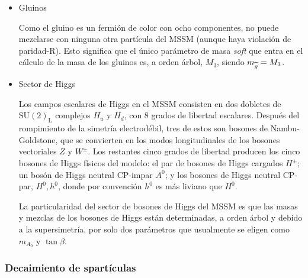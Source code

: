 \begin{itemize}
\item Gluinos

Como el gluino es un fermión de color con ocho componentes, no puede mezclarse con ninguna
otra partícula del MSSM (aunque haya violación de paridad-R). Esto significa que el único
parámetro de masa \emph{soft} que entra en el cálculo de la masa de los gluinos es, a
orden árbol, $M_3$, siendo $m_{\widetilde{g}} = M_3$.


\item Sector de Higgs

  Los campos escalares de Higgs en el MSSM consisten en dos dobletes de
  $\text{SU}(2)_\text{L}$ complejos $H_u$ y $H_d$, con 8 grados de libertad
  escalares. Después del rompimiento de la simetría electrodébil, tres de estos
  son bosones de Nambu-Goldstone, que se convierten en los modos longitudinales de
  los bosones vectoriales $Z$ y $W^\pm$. Los restantes cinco grados de libertad
  producen los cinco bosones de Higgs físicos del modelo: el par de bosones de
  Higgs cargados $H^\pm$; un bosón de Higgs neutral CP-impar $A^0$; y los bosones
  de Higgs neutral CP-par, $H^0,h^0$, donde por convención $h^0$ es más liviano
  que $H^0$.

  La particularidad del sector de bosones de Higgs del MSSM es que las masas y mezclas
  de los bosones de Higgs están determinadas, a orden árbol y debido a la supersimetría,
  por solo dos parámetros que usualmente se eligen como $m_{A_0}$ y $\tan \beta$.


\end{itemize}


\subsubsection{Decaimiento de spartículas}

